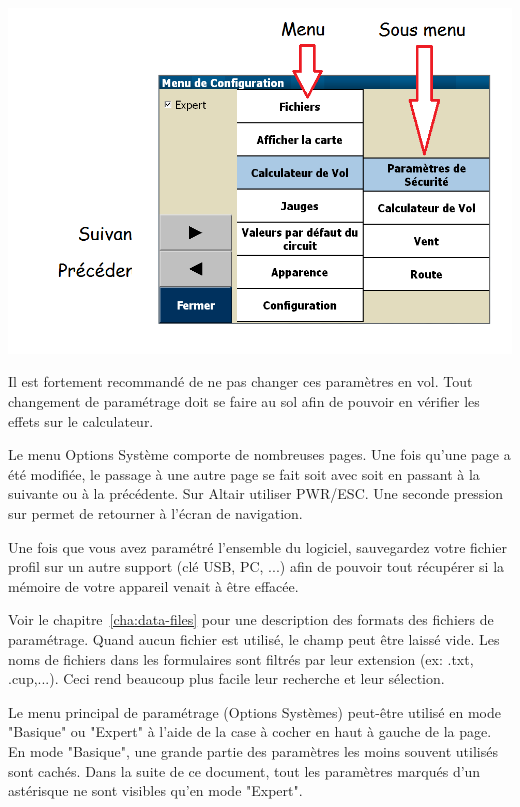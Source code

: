 \begin{center}
\includegraphics[angle=0,width=1.0\linewidth,keepaspectratio='true']{figures/config-menu.png}
\end{center}

Il est fortement recommandé de ne pas changer ces paramètres en vol. \warning Tout changement de paramétrage doit se faire au sol afin de pouvoir en vérifier les effets sur le calculateur. 

Le menu Options Système comporte de nombreuses pages. Une fois qu'une page a été modifiée, le passage à une autre page se fait soit avec   soit en passant à la suivante ou à la précédente. Sur Altair utiliser PWR/ESC. Une seconde pression sur  permet de retourner à l'écran de navigation.

\tip Une fois que vous avez paramétré l'ensemble du logiciel, sauvegardez votre fichier profil sur un autre support (clé USB, PC, ...) afin de pouvoir tout récupérer si la mémoire de votre appareil venait à être effacée.

Voir le chapitre~\ref{cha:data-files} pour une description des formats des fichiers de paramétrage. Quand aucun fichier est utilisé, le champ peut être laissé vide. Les noms de fichiers dans les formulaires sont filtrés par leur extension (ex: .txt, .cup,...). Ceci rend beaucoup plus facile leur recherche et leur sélection.

Le menu principal de paramétrage (Options Systèmes) peut-être utilisé en mode "Basique" ou "Expert" à l'aide de la case à cocher en haut à gauche de la page.  En mode "Basique", une grande partie des paramètres les moins souvent utilisés sont cachés. Dans la suite de ce document, tout les paramètres marqués d'un astérisque ne sont visibles qu'en mode "Expert".


